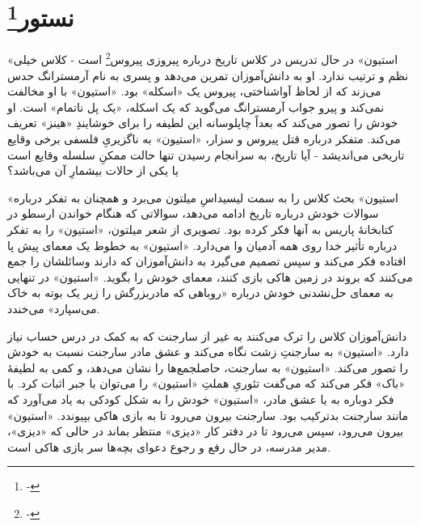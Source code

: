 \documentclass[12pt]{book}
\newcommand{\noun}[1]{«{#1}»}
\begin{document}
    \chapter[نستور]{نستور\protect\footnote{-}}\label{ep:2}
    \noun{استیون} در حال تدریس در کلاس تاریخ درباره پیروزی پیروس\footnote{-} است - کلاس خیلی نظم و ترتیب ندارد. او به دانش‌آموزان تمرین می‌دهد و پسری به نام آرمسترانگ حدس می‌زند که از لحاظ آواشناختی، پیروس یک «اسکله» بود. \noun{استیون} با او مخالفت نمی‌کند و پیرو جواب آرمسترانگ می‌گوید که یک اسکله، «یک پل ناتمام» است. او خودش را تصور می‌کند که بعداً چاپلوسانه این لطیفه را برای خوشایندِ \noun{هینز}  تعریف می‌کند. متفکر درباره قتل پیروس و سزار، \noun{استیون} به ناگزیریِ فلسفی برخی وقایع تاریخی می‌اندیشد - آیا تاریخ، به سرانجام رسیدن تنها حالت ممکنِ سلسله وقایع است یا یکی از حالات بیشمارِ آن می‌باشد؟

    \noun{استیون} بحث کلاس را به سمت لیسیداسِ میلتون می‌برد و همچنان به تفکر درباره سوالات خودش درباره تاریخ ادامه می‌دهد، سوالاتی که هنگام خواندن ارسطو در کتابخانۀ پاریس به آنها فکر کرده بود. تصویری از شعر میلتون، \noun{استیون} را به تفکر درباره تأثیر خدا روی همه آدمیان وا می‌دارد. \noun{استیون} به خطوط یک معمای پیش پا افتاده فکر می‌کند و سپس تصمیم می‌گیرد به دانش‌آموزان که دارند وسائلشان را جمع می‌کنند که بروند در زمین هاکی بازی کنند، معمای خودش را بگوید. \noun{استیون} در تنهایی به معمای حل‌نشدنی خودش درباره «روباهی که مادربزرگش را زیر یک بوته به خاک می‌سپارد» می‌خندد.

    دانش‌آموزان کلاس را ترک می‌کنند به غیر از سارجنت که به کمک در درس حساب نیاز دارد. \noun{استیون} به سارجنتِ زشت نگاه می‌کند و عشق مادر سارجنت نسبت به خودش را تصور می‌کند. \noun{استیون} به سارجنت، حاصلجمع‌ها را نشان می‌دهد، و کمی به لطیفۀ \noun{باک}  فکر می‌کند که می‌گفت تئوریِ هملتِ \noun{استیون} را می‌توان با جبر اثبات کرد. با فکر دوباره به  یا عشق مادر، \noun{استیون} خودش را به شکل کودکی به یاد می‌آورد که مانند سارجنت بدترکیب بود. سارجنت بیرون می‌رود تا به بازی هاکی بپیوندد. \noun{استیون} بیرون می‌رود، سپس می‌رود تا در دفتر کار \noun{دیزی} منتظر بماند در حالی که \noun{دیزی}، مدیر مدرسه، در حال رفع و رجوع دعوای بچه‌ها سر بازی هاکی است.
\end{document}
